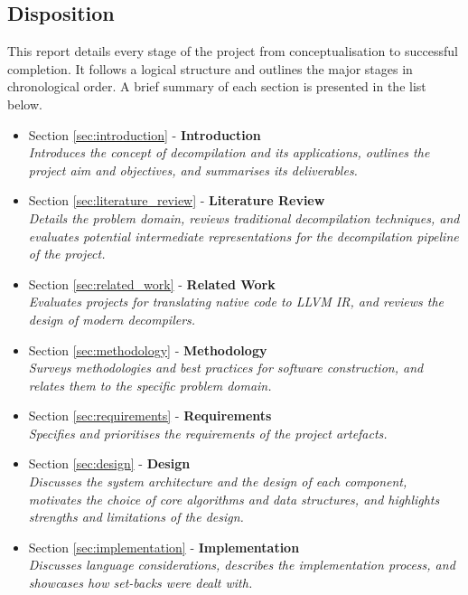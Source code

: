 
\subsection{Disposition}

This report details every stage of the project from conceptualisation to successful completion. It follows a logical structure and outlines the major stages in chronological order. A brief summary of each section is presented in the list below.

\begin{itemize}
	\item Section \ref{sec:introduction} - \textbf{Introduction} \\ \textit{Introduces the concept of decompilation and its applications, outlines the project aim and objectives, and summarises its deliverables.}
	\item Section \ref{sec:literature_review} - \textbf{Literature Review} \\ \textit{Details the problem domain, reviews traditional decompilation techniques, and evaluates potential intermediate representations for the decompilation pipeline of the project.}
	\item Section \ref{sec:related_work} - \textbf{Related Work} \\ \textit{Evaluates projects for translating native code to LLVM IR, and reviews the design of modern decompilers.}
	\item Section \ref{sec:methodology} - \textbf{Methodology} \\ \textit{Surveys methodologies and best practices for software construction, and relates them to the specific problem domain.}
	\item Section \ref{sec:requirements} - \textbf{Requirements} \\ \textit{Specifies and prioritises the requirements of the project artefacts.}
	\item Section \ref{sec:design} - \textbf{Design} \\ \textit{Discusses the system architecture and the design of each component, motivates the choice of core algorithms and data structures, and highlights strengths and limitations of the design.}
	\item Section \ref{sec:implementation} - \textbf{Implementation} \\ \textit{Discusses language considerations, describes the implementation process, and showcases how set-backs were dealt with.}

\end{itemize}
